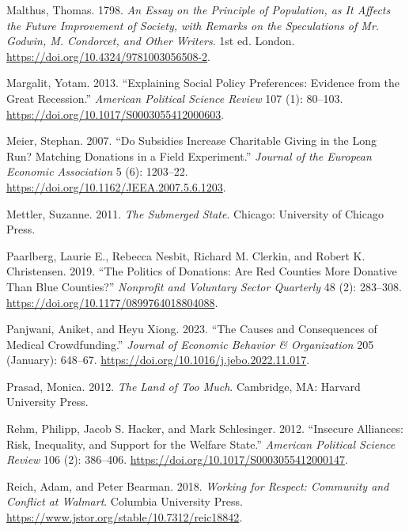 \documentclass[
  11pt,
  oneside]{article}
\newlength{\cslhangindent}
\newenvironment{CSLReferences}[2] %
 {\begin{list}{}{%
  \setlength{\itemindent}{0pt}
  \setlength{\leftmargin}{0pt}
  \setlength{\parsep}{0pt}
  \ifodd #1
   \setlength{\leftmargin}{\cslhangindent}
   \setlength{\itemindent}{-1\cslhangindent}
  \fi
  \setlength{\itemsep}{#2\baselineskip}}}
 {\end{list}}
\begin{document}
\begin{CSLReferences}{1}{0}
Malthus, Thomas. 1798. \emph{An {Essay} on the {Principle} of {Population}, as It {Affects} the {Future Improvement} of {Society}, with {Remarks} on the {Speculations} of {Mr}. {Godwin}, {M}. {Condorcet}, and {Other Writers}}. 1st ed. London. \url{https://doi.org/10.4324/9781003056508-2}.

Margalit, Yotam. 2013. {``Explaining {Social Policy Preferences}: {Evidence} from the {Great Recession}.''} \emph{American Political Science Review} 107 (1): 80--103. \url{https://doi.org/10.1017/S0003055412000603}.

Meier, Stephan. 2007. {``Do {Subsidies Increase Charitable Giving} in the {Long Run}? {Matching Donations} in a {Field Experiment}.''} \emph{Journal of the European Economic Association} 5 (6): 1203--22. \url{https://doi.org/10.1162/JEEA.2007.5.6.1203}.

Mettler, Suzanne. 2011. \emph{The {Submerged State}}. Chicago: University of Chicago Press.

Paarlberg, Laurie E., Rebecca Nesbit, Richard M. Clerkin, and Robert K. Christensen. 2019. {``The {Politics} of {Donations}: {Are Red Counties More Donative Than Blue Counties}?''} \emph{Nonprofit and Voluntary Sector Quarterly} 48 (2): 283--308. \url{https://doi.org/10.1177/0899764018804088}.

Panjwani, Aniket, and Heyu Xiong. 2023. {``The Causes and Consequences of Medical Crowdfunding.''} \emph{Journal of Economic Behavior \& Organization} 205 (January): 648--67. \url{https://doi.org/10.1016/j.jebo.2022.11.017}.

Prasad, Monica. 2012. \emph{The {Land} of {Too Much}}. Cambridge, MA: Harvard University Press.

Rehm, Philipp, Jacob S. Hacker, and Mark Schlesinger. 2012. {``Insecure {Alliances}: {Risk}, {Inequality}, and {Support} for the {Welfare State}.''} \emph{American Political Science Review} 106 (2): 386--406. \url{https://doi.org/10.1017/S0003055412000147}.

Reich, Adam, and Peter Bearman. 2018. \emph{Working for {Respect}: {Community} and {Conflict} at {Walmart}}. Columbia University Press. \url{https://www.jstor.org/stable/10.7312/reic18842}.


\end{CSLReferences}
\end{document}
